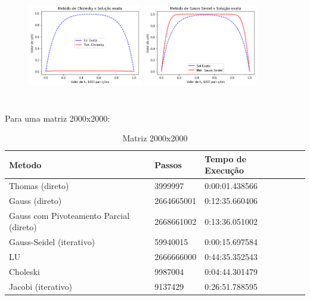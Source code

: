 \documentclass{article}
\begin{document}
\begin{itemize}
\begin{figure}[!htb]
\includegraphics [width=5cm,height=5cm]{Cho1000part.png}
\includegraphics [width=5cm,height=5cm]{GS1000part.png}
\end{figure}


\newpage

\text Para uma matriz 2000x2000:

\begin{table}[h]
\centering
  \begin{tabular}{l||l|lll}
    Metodo & Passos & Tempo de Execução \\
    \hline
    Thomas (direto) & 3999997  & 0:00:01.438566 \\
    
    Gauss (direto) & 2664665001 & 0:12:35.660406 \\
    
    Gauss com Pivoteamento Parcial (direto) & 2668661002 & 0:13:36.051002 \\
    
    Gauss-Seidel (iterativo) & 59940015  &  0:00:15.697584 \\
    
    LU & 2666666000 & 0:44:35.352543 \\
    
    Choleski & 9987004 & 0:04:44.301479 \\
    
    Jacobi (iterativo) & 9137429 & 0:26:51.788595  \\
    \hline
  \end{tabular}
  \caption{Matriz 2000x2000}
\end{table}



\end{itemize}
\end{document}
